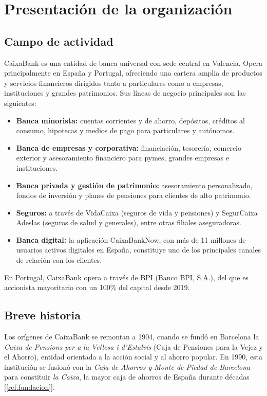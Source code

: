 
\chapter{Presentación de la organización}

\section{Campo de actividad}

CaixaBank es una entidad de banca universal con sede central en Valencia. Opera
principalmente en España y Portugal, ofreciendo una cartera amplia de productos y
servicios financieros dirigidos tanto a particulares como a empresas, instituciones y
grandes patrimonios. Sus líneas de negocio principales son las siguientes:

\begin{itemize}
  \item \textbf{Banca minorista:} cuentas corrientes y de ahorro, depósitos, créditos
    al consumo, hipotecas y medios de pago para particulares y autónomos.
  \item \textbf{Banca de empresas y corporativa:} financiación, tesorería, comercio
    exterior y asesoramiento financiero para pymes, grandes empresas e instituciones.
  \item \textbf{Banca privada y gestión de patrimonio:} asesoramiento personalizado,
    fondos de inversión y planes de pensiones para clientes de alto patrimonio.
  \item \textbf{Seguros:} a través de VidaCaixa (seguros de vida y pensiones) y
    SegurCaixa Adeslas (seguros de salud y generales), entre otras filiales aseguradoras.
  \item \textbf{Banca digital:} la aplicación CaixaBankNow, con más de 11 millones de
    usuarios activos digitales en España, constituye uno de los principales canales de
    relación con los clientes.
\end{itemize}

En Portugal, CaixaBank opera a través de BPI (Banco BPI, S.A.), del que es accionista
mayoritario con un 100\% del capital desde 2019.

\section{Breve historia}

Los orígenes de CaixaBank se remontan a 1904, cuando se fundó en Barcelona la
\textit{Caixa de Pensions per a la Vellesa i d'Estalvis} (Caja de Pensiones para la Vejez
y el Ahorro), entidad orientada a la acción social y al ahorro popular. En 1990, esta
institución se fusionó con la \textit{Caja de Ahorros y Monte de Piedad de Barcelona}
para constituir \textit{la Caixa}, la mayor caja de ahorros de España durante décadas
[\ref{ref:fundacion}].

